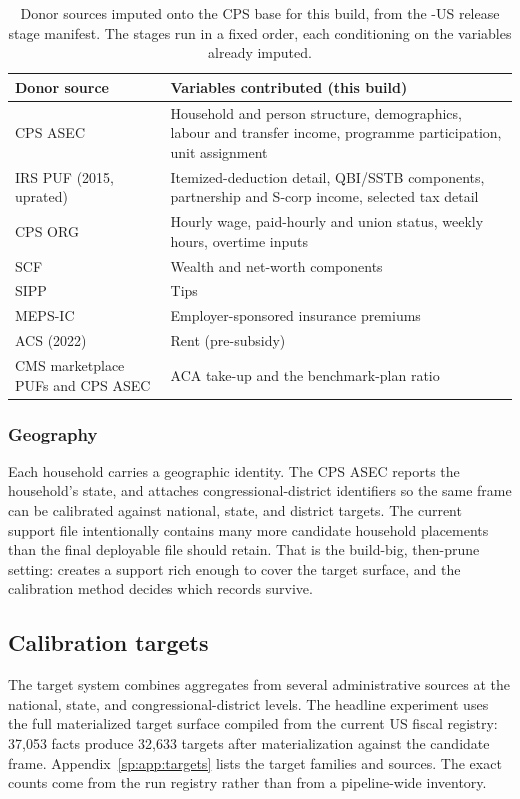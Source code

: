 \begin{table}[H]
\centering
{\tablefont
\begin{tabular}{@{}p{}p{}@{}}
\toprule
Donor source & Variables contributed (this build) \\
\midrule
CPS ASEC & Household and person structure, demographics, labour and transfer income, programme participation, unit assignment \\
IRS PUF (2015, uprated) & Itemized-deduction detail, QBI/SSTB components, partnership and S-corp income, selected tax detail \\
CPS ORG & Hourly wage, paid-hourly and union status, weekly hours, overtime inputs \\
SCF & Wealth and net-worth components \\
SIPP & Tips \\
MEPS-IC & Employer-sponsored insurance premiums \\
ACS (2022) & Rent (pre-subsidy) \\
CMS marketplace PUFs and CPS ASEC & ACA take-up and the benchmark-plan ratio \\
\bottomrule
\end{tabular}
}
\caption{Donor sources imputed onto the CPS base for this build, from the \populace{}-US release stage
manifest. The stages run in a fixed order, each conditioning on the variables already imputed.}
\label{sp:tab:donors}
\end{table}

\subsubsection{Geography}

Each household carries a geographic identity. The CPS ASEC reports the household's state, and
\populace{} attaches congressional-district identifiers so the same frame can be calibrated against
national, state, and district targets. The current support file intentionally contains many more
candidate household placements than the final deployable file should retain. That is the build-big,
then-prune setting: \populace{} creates a support rich enough to cover the target surface, and the
calibration method decides which records survive.

\subsection{Calibration targets}

The target system combines aggregates from several administrative sources at the national, state, and
congressional-district levels. The headline experiment uses the full materialized target surface compiled
from the current \populace{} US fiscal registry: 37{,}053 \chronicle{} facts produce 32{,}633 targets after
materialization against the candidate frame. Appendix~\ref{sp:app:targets} lists the target families and
sources. The exact counts come from the run registry rather than from a pipeline-wide inventory.


